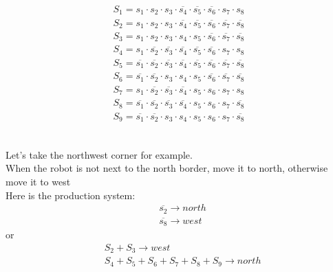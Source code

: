 \documentclass[paper=a4, fontsize=11pt]{scrartcl} %
\numberwithin{equation}{section} %
\numberwithin{figure}{section} %
\numberwithin{table}{section} %
\begin{document}
\begin{align*}
S_1 = s_1 \cdot s_2 \cdot s_3 \cdot \overline{s_4} \cdot \overline{s_5} \cdot \overline{s_6} \cdot s_7 \cdot s_8\\
S_2 = s_1 \cdot s_2 \cdot s_3 \cdot \overline{s_4} \cdot \overline{s_5} \cdot \overline{s_6} \cdot \overline{s_7} \cdot \overline{s_8}\\
S_3 = s_1 \cdot s_2 \cdot s_3 \cdot s_4 \cdot s_5 \cdot \overline{s_6} \cdot \overline{s_7} \cdot \overline{s_8}\\
S_4 = s_1 \cdot \overline{s_2} \cdot \overline{s_3} \cdot \overline{s_4} \cdot \overline{s_5} \cdot \overline{s_6} \cdot s_7 \cdot s_8\\
S_5 = \overline{s_1} \cdot \overline{s_2} \cdot \overline{s_3} \cdot \overline{s_4} \cdot \overline{s_5} \cdot \overline{s_6} \cdot \overline{s_7} \cdot \overline{s_8}\\
S_6 = \overline{s_1} \cdot \overline{s_2} \cdot s_3 \cdot s_4 \cdot s_5 \cdot \overline{s_6} \cdot \overline{s_7} \cdot \overline{s_8}\\
S_7 = s_1 \cdot \overline{s_2} \cdot \overline{s_3} \cdot \overline{s_4} \cdot s_5 \cdot s_6 \cdot s_7 \cdot s_8\\
S_8 = \overline{s_1} \cdot \overline{s_2} \cdot \overline{s_3} \cdot \overline{s_4} \cdot s_5 \cdot s_6 \cdot s_7 \cdot \overline{s_8}\\
S_9 = \overline{s_1} \cdot \overline{s_2} \cdot s_3 \cdot s_4 \cdot s_5 \cdot s_6 \cdot s_7 \cdot \overline{s_8}\\
\end{align*}


\subsection{}

Let's take the northwest corner for example.\\

When the robot is not next to the north border, move it to north, otherwise move it to west\\

Here is the production system:\\

\boldmath \begin{align*}
&\overline{s_2} \longrightarrow north\\
&\overline{s_8} \longrightarrow west
\end{align*}
or
\boldmath \begin{align*}
&S_2+S_3 \longrightarrow west\\
&S_4+S_5+S_6+S_7+S_8+S_9 \longrightarrow north
\end{align*}
\end{document}
